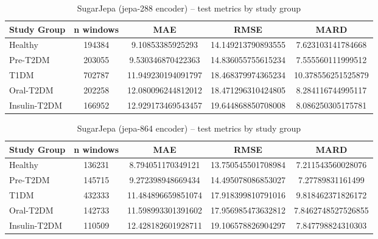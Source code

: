 \documentclass[11pt,a4paper]{article}
\begin{document}
\begin{table}[ht]
    \centering
    \begin{tabular}{lcccc}
        \hline
        Study Group & n windows & MAE & RMSE & MARD \\
        \hline
        Healthy & 194384 & 9.10853385925293 & 14.149213790893555 & 7.623103141784668 \\
        Pre-T2DM & 203055 & 9.530346870422363 & 14.836055755615234 & 7.555560111999512 \\
        T1DM & 702787 & 11.949230194091797 & 18.468379974365234 & 10.378556251525879 \\
        Oral-T2DM & 202258 & 12.080096244812012 & 18.471296310424805 & 8.284116744995117 \\
        Insulin-T2DM & 166952 & 12.929173469543457 & 19.644868850708008 & 8.086250305175781 \\
        \hline
    \end{tabular}
    \caption{SugarJepa (jepa-288 encoder) -- test metrics by study group}
    \label{tab:sugar-jepa-288-study-group-metrics}
\end{table}

\begin{table}[ht]
    \centering
    \begin{tabular}{lcccc}
        \hline
        Study Group & n windows & MAE & RMSE & MARD \\
        \hline
        Healthy & 136231 & 8.794051170349121 & 13.750545501708984 & 7.211543560028076 \\
        Pre-T2DM & 145715 & 9.272398948669434 & 14.495078086853027 & 7.27789831161499 \\
        T1DM & 432333 & 11.484896659851074 & 17.918399810791016 & 9.818462371826172 \\
        Oral-T2DM & 142733 & 11.598993301391602 & 17.956985473632812 & 7.8462748527526855 \\
        Insulin-T2DM & 110509 & 12.428182601928711 & 19.106578826904297 & 7.847798824310303 \\
        \hline
    \end{tabular}
    \caption{SugarJepa (jepa-864 encoder) -- test metrics by study group}
    \label{tab:sugar-jepa-864-study-group-metrics}
\end{table}
\end{document}
